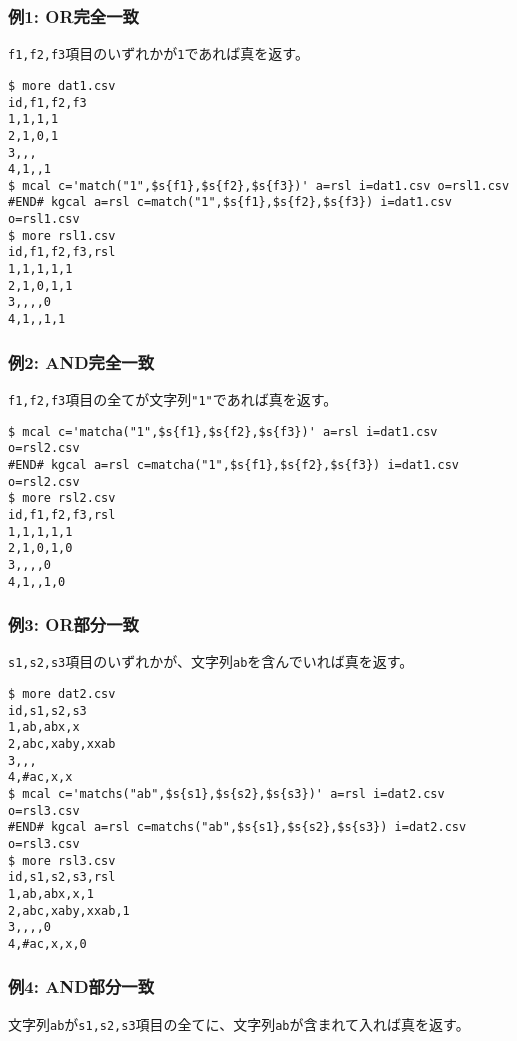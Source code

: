 \subsubsection*{例1: OR完全一致}

\verb|f1,f2,f3|項目のいずれかが\verb|1|であれば真を返す。


\begin{Verbatim}[baselinestretch=0.7,frame=single]
$ more dat1.csv
id,f1,f2,f3
1,1,1,1
2,1,0,1
3,,,
4,1,,1
$ mcal c='match("1",$s{f1},$s{f2},$s{f3})' a=rsl i=dat1.csv o=rsl1.csv
#END# kgcal a=rsl c=match("1",$s{f1},$s{f2},$s{f3}) i=dat1.csv o=rsl1.csv
$ more rsl1.csv
id,f1,f2,f3,rsl
1,1,1,1,1
2,1,0,1,1
3,,,,0
4,1,,1,1
\end{Verbatim}
\subsubsection*{例2: AND完全一致}

\verb|f1,f2,f3|項目の全てが文字列\verb|"1"|であれば真を返す。


\begin{Verbatim}[baselinestretch=0.7,frame=single]
$ mcal c='matcha("1",$s{f1},$s{f2},$s{f3})' a=rsl i=dat1.csv o=rsl2.csv
#END# kgcal a=rsl c=matcha("1",$s{f1},$s{f2},$s{f3}) i=dat1.csv o=rsl2.csv
$ more rsl2.csv
id,f1,f2,f3,rsl
1,1,1,1,1
2,1,0,1,0
3,,,,0
4,1,,1,0
\end{Verbatim}
\subsubsection*{例3: OR部分一致}

\verb|s1,s2,s3|項目のいずれかが、文字列\verb|ab|を含んでいれば真を返す。


\begin{Verbatim}[baselinestretch=0.7,frame=single]
$ more dat2.csv
id,s1,s2,s3
1,ab,abx,x
2,abc,xaby,xxab
3,,,
4,#ac,x,x
$ mcal c='matchs("ab",$s{s1},$s{s2},$s{s3})' a=rsl i=dat2.csv o=rsl3.csv
#END# kgcal a=rsl c=matchs("ab",$s{s1},$s{s2},$s{s3}) i=dat2.csv o=rsl3.csv
$ more rsl3.csv
id,s1,s2,s3,rsl
1,ab,abx,x,1
2,abc,xaby,xxab,1
3,,,,0
4,#ac,x,x,0
\end{Verbatim}
\subsubsection*{例4: AND部分一致}

文字列\verb|ab|が\verb|s1,s2,s3|項目の全てに、文字列\verb|ab|が含まれて入れば真を返す。


